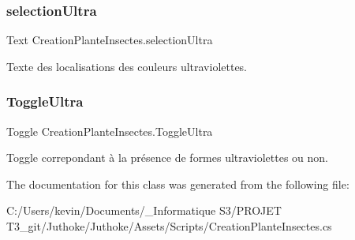 \subsubsection{\texorpdfstring{selection\+Ultra}{selectionUltra}}
{\footnotesize\ttfamily Text Creation\+Plante\+Insectes.\+selection\+Ultra}

Texte des localisations des couleurs ultraviolettes. \mbox{\label{class_creation_plante_insectes_a8ddc64fd85406e87da85761df2b2f419}} 
\subsubsection{\texorpdfstring{Toggle\+Ultra}{ToggleUltra}}
{\footnotesize\ttfamily Toggle Creation\+Plante\+Insectes.\+Toggle\+Ultra}

Toggle correpondant à la présence de formes ultraviolettes ou non. 

The documentation for this class was generated from the following file\+:\begin{DoxyCompactItemize}
\item 
C\+:/\+Users/kevin/\+Documents/\+\_\+\+Informatique S3/\+P\+R\+O\+J\+E\+T T3\+\_\+git/\+Juthoke/\+Juthoke/\+Assets/\+Scripts/Creation\+Plante\+Insectes.\+cs\end{DoxyCompactItemize}
